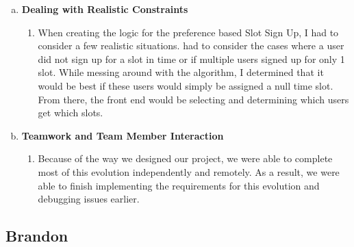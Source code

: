 \documentclass[11pt]{article}   %
\begin{document}
\begin{enumerate} [a)]
\begin{enumerate} [$\cdot$]
\end{enumerate}
\item {\bf Dealing with Realistic Constraints}
\begin{enumerate} [$\cdot$]
\item When creating the logic for the preference based Slot Sign Up, I had to consider a few realistic situations.  had to consider the cases where a user did not sign up for a slot in time or if multiple users signed up for only 1 slot.  While messing around with the algorithm, I determined that it would be best if these users would simply be assigned a null time slot.  From there, the front end would be selecting and determining which users get which slots.
\end{enumerate}
\item  {\bf Teamwork and Team Member Interaction}
\begin{enumerate} [$\cdot$]
\item Because of the way we designed our project, we were able to complete most of this evolution independently and remotely. As a result, we were able to finish implementing the requirements for this evolution and debugging issues earlier.
\end{enumerate}
\end{enumerate}

\subsection*{Brandon}
\end{document}
